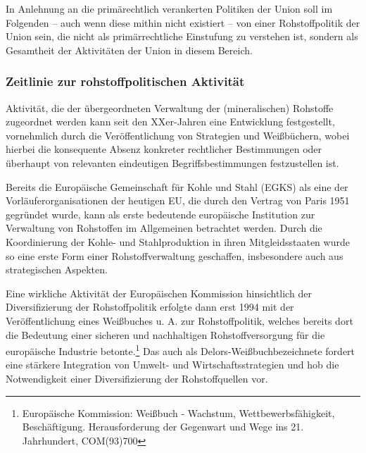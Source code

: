 \documentclass[12pt,a4paper,oneside]{book} %
\begin{document}
In Anlehnung an die primärechtlich verankerten Politiken der Union soll im Folgenden -- auch wenn diese mithin nicht existiert -- von einer Rohstoffpolitik der Union sein, die nicht als primärrechtliche Einstufung zu verstehen ist, sondern als Gesamtheit der Aktivitäten der Union in diesem Bereich.
	
\subsubsection{Zeitlinie zur rohstoffpolitischen Aktivität}
	
Aktivität, die der übergeordneten Verwaltung der (mineralischen) Rohstoffe zugeordnet werden kann seit den XXer-Jahren eine Entwicklung festgestellt, vornehmlich durch die Veröffentlichung von Strategien und Weißbüchern, wobei hierbei die konsequente Absenz konkreter rechtlicher Bestimmungen oder überhaupt von relevanten eindeutigen Begriffsbestimmungen festzustellen ist.
	
Bereits die Europäische Gemeinschaft für Kohle und Stahl (EGKS) als eine der Vorläuferorganisationen der heutigen EU, die durch den Vertrag von Paris 1951 gegründet wurde, kann als erste bedeutende europäische Institution zur Verwaltung von Rohstoffen im Allgemeinen betrachtet werden. Durch die Koordinierung der Kohle- und Stahlproduktion in ihren Mitgleidsstaaten wurde so eine erste Form einer Rohstoffverwaltung geschaffen, insbesondere auch aus strategischen Aspekten.%
	
Eine wirkliche Aktivität der Europäischen Kommission hinsichtlich der Diversifizierung der Rohstoffpolitik erfolgte dann erst 1994 mit der Veröffentlichung eines Weißbuches u. A. zur Rohstoffpolitik, welches bereits dort die Bedeutung einer sicheren und nachhaltigen Rohstoffversorgung für die europäische Industrie betonte.\footnote{Europäische Kommission: Weißbuch - Wachstum, Wettbewerbsfähigkeit, Beschäftigung. Herausforderung der Gegenwart und Wege ins 21. Jahrhundert, COM(93)700}
Das auch als \glqq Delors-Weißbuch\grqq bezeichnete  fordert eine stärkere Integration von Umwelt- und Wirtschaftsstrategien und hob die Notwendigkeit einer Diversifizierung der Rohstoffquellen vor.
	
	
\end{document}
